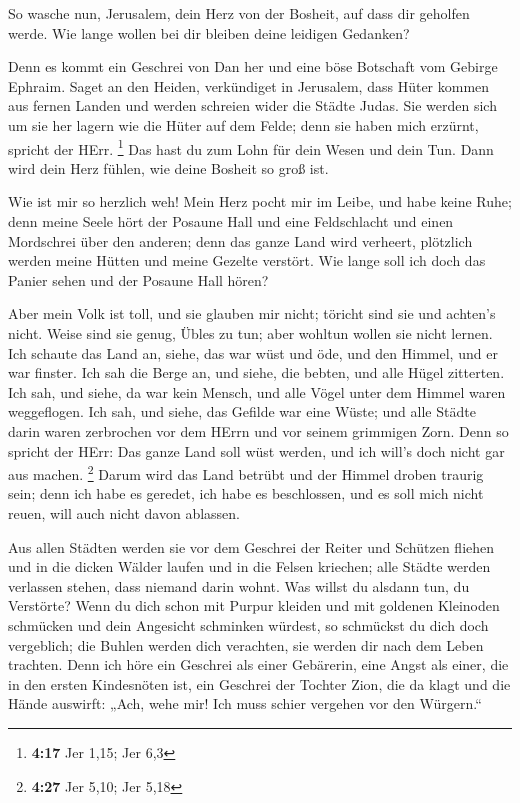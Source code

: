  So wasche nun, Jerusalem, dein Herz von der Bosheit, auf
dass dir geholfen werde. Wie lange wollen bei dir bleiben deine leidigen
Gedanken?

 Denn es kommt ein Geschrei von Dan her und eine böse
Botschaft vom Gebirge Ephraim.  Saget an den Heiden,
verkündiget in Jerusalem, dass Hüter kommen aus fernen Landen und werden
schreien wider die Städte Judas.  Sie werden sich um sie
her lagern wie die Hüter auf dem Felde; denn sie haben mich erzürnt,
spricht der HErr. \footnote{\textbf{4:17} Jer 1,15; Jer 6,3}
 Das hast du zum Lohn für dein Wesen und dein Tun. Dann
wird dein Herz fühlen, wie deine Bosheit so groß ist.

 Wie ist mir so herzlich weh! Mein Herz pocht mir im
Leibe, und habe keine Ruhe; denn meine Seele hört der Posaune Hall und
eine Feldschlacht  und einen Mordschrei über den anderen;
denn das ganze Land wird verheert, plötzlich werden meine Hütten und
meine Gezelte verstört.  Wie lange soll ich doch das
Panier sehen und der Posaune Hall hören?

 Aber mein Volk ist toll, und sie glauben mir nicht;
töricht sind sie und achten's nicht. Weise sind sie genug, Übles zu tun;
aber wohltun wollen sie nicht lernen.  Ich schaute das
Land an, siehe, das war wüst und öde, und den Himmel, und er war
finster.  Ich sah die Berge an, und siehe, die bebten,
und alle Hügel zitterten.  Ich sah, und siehe, da war
kein Mensch, und alle Vögel unter dem Himmel waren weggeflogen.
 Ich sah, und siehe, das Gefilde war eine Wüste; und alle
Städte darin waren zerbrochen vor dem HErrn und vor seinem grimmigen
Zorn.  Denn so spricht der HErr: Das ganze Land soll wüst
werden, und ich will's doch nicht gar aus machen. \footnote{\textbf{4:27}
  Jer 5,10; Jer 5,18}  Darum wird das Land betrübt und
der Himmel droben traurig sein; denn ich habe es geredet, ich habe es
beschlossen, und es soll mich nicht reuen, will auch nicht davon
ablassen.

 Aus allen Städten werden sie vor dem Geschrei der Reiter
und Schützen fliehen und in die dicken Wälder laufen und in die Felsen
kriechen; alle Städte werden verlassen stehen, dass niemand darin wohnt.
 Was willst du alsdann tun, du Verstörte? Wenn du dich
schon mit Purpur kleiden und mit goldenen Kleinoden schmücken und dein
Angesicht schminken würdest, so schmückst du dich doch vergeblich; die
Buhlen werden dich verachten, sie werden dir nach dem Leben trachten.
 Denn ich höre ein Geschrei als einer Gebärerin, eine
Angst als einer, die in den ersten Kindesnöten ist, ein Geschrei der
Tochter Zion, die da klagt und die Hände auswirft: „Ach, wehe mir! Ich
muss schier vergehen vor den Würgern.``


